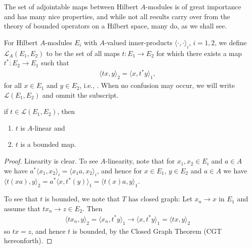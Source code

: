 The set of adjointable maps between Hilbert $A$-modules is of great importance and has many nice properties, and while not all results carry over from the theory of bounded operators on a Hilbert space, many do, as we shall see.
\begin{definition}
	For Hilbert $A$-modules $E_i$ with $A$-valued inner-products $\langle \cdot , \cdot\rangle_i$, $i=1,2$, we define $\mathcal{L}_A(E_1,E_2)$ to be the set of all maps $t \colon E_1 \to E_2$ for which there exists a map $t^* \colon E_2 \to E_1$ such that
	\begin{align*}
		\langle tx, y \rangle_2 = \langle x , t^*y \rangle_1,
	\end{align*}
	for all $x \in E_1$ and $y \in E_2$, i.e., . When no confusion may occur, we will write $\mathcal{L}(E_1,E_2)$ and ommit the subscript.
\end{definition}
\begin{proposition}
	if $t \in \mathcal{L}(E_1,E_2)$, then
\begin{enumerate}
	\item $t$ is $A$-linear and\\
	\item $t$ is a bounded map.
\end{enumerate}
\end{proposition}
\begin{proof}
	Linearity is clear. To see $A$-linearity, note that for $x_1,x_2 \in E_i$ and $a \in A$ we have $a^* \langle x_1,x_2\rangle_i = \langle x_1 a , x_2\rangle_i$, and hence for $x \in E_1$, $y \in E_2$ and $a \in A$ we have $\langle t(xa) , y \rangle_2 = a^* \langle x,t^*(y)\rangle_1 = \langle t(x)a,y\rangle_1$.

	To see that $t$ is bounded, we note that $T$ has closed graph: Let $x_n \to x$ in $E_1$ and assume that $tx_n \to z \in E_2$. Then
	\begin{align*}
		\langle tx_n , y\rangle_2  = \langle x_n, t^*y\rangle_1 \to \langle x, t^*y \rangle_1 = \langle tx,y\rangle_2
	\end{align*}
	so $tx = z$, and hence $t$ is bounded, by the Closed Graph Theorem (CGT hereonforth).
\end{proof}

